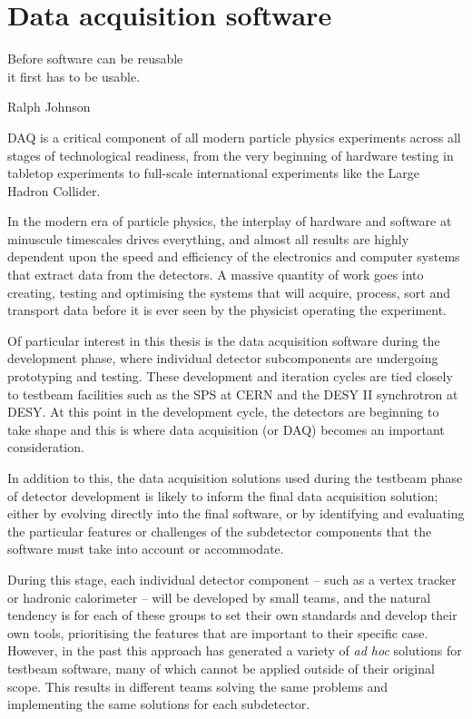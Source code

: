 \chapter{Data acquisition software}
\label{chapter:dqm4hep}

\epigraph{Before software can be reusable \\it first has to be usable.}{Ralph Johnson}

\acrfull{DAQ} is a critical component of all modern particle physics experiments across all stages of technological readiness, from the very beginning of hardware testing in tabletop experiments to full-scale international experiments like the Large Hadron Collider.

In the modern era of particle physics, the interplay of hardware and software at minuscule timescales drives everything, and almost all results are highly dependent upon the speed and efficiency of the electronics and computer systems that extract data from the detectors. A massive quantity of work goes into creating, testing and optimising the systems that will acquire, process, sort and transport data before it is ever seen by the physicist operating the experiment.

Of particular interest in this thesis is the data acquisition software during the development phase, where individual detector subcomponents are undergoing prototyping and testing. These development and iteration cycles are tied closely to testbeam facilities such as the \acrfull{SPS} at \acrshort{CERN} and the DESY II synchrotron at \acrshort{DESY}. At this point in the development cycle, the detectors are beginning to take shape and this is where data acquisition (or \acrshort{DAQ}) becomes an important consideration. 

In addition to this, the data acquisition solutions used during the testbeam phase of detector development is likely to inform the final data acquisition solution; either by evolving directly into the final software, or by identifying and evaluating the particular features or challenges of the subdetector components that the software must take into account or accommodate.

During this stage, each individual detector component -- such as a vertex tracker or hadronic calorimeter -- will be developed by small teams, and the natural tendency is for each of these groups to set their own standards and develop their own tools, prioritising the features that are important to their specific case. However, in the past this approach has generated a variety of \textit{ad hoc} solutions for testbeam software, many of which cannot be applied outside of their original scope. This results in different teams solving the same problems and implementing the same solutions for each subdetector.

